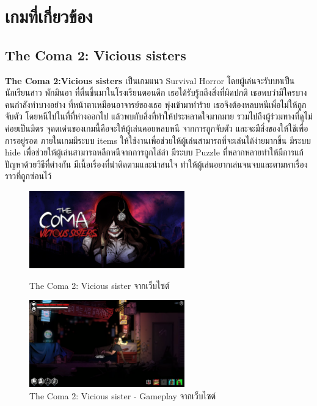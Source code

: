 \section{เกมที่เกี่ยวข้อง}
\subsection{The Coma 2: Vicious sisters}
\subsubitem \textbf{The Coma 2:Vicious sisters} \cite{the-coma-2:theory} 
เป็นเกมแนว Survival Horror โดยผู้เล่นจะรับบทเป็นนักเรียนสาว พักมินอา ที่ตื่นขึ้นมาในโรงเรียนตอนดึก 
เธอได้รับรู้ถถึงสิ่งที่ผิดปกติ เธอพบว่ามีใครบางคนกำลังทำบางอย่าง ที่หน้าตาเหมือนอาจารย์ของเธอ พุ่งเข้ามาทำร้าย 
เธอจึงต้องหลบหนีเพื่อไม่ให้ถูกจับตัว โดยหนีไปในที่ที่ห่างออกไป แล้วพบกับสิ่งที่ทำให้ประหลาดใจมากมาย 
รวมไปถึงผู้ร่วมทางที่ดูไม่ค่อยเป็นมิตร จุดดเด่นของเกมนี้คือจะให้ผู้เล่นคอยหลบหนี 
จากการถูกจับตัว และจะมีสิ่งของให้ใช้เพื่อการอยู่รอด ภายในเกมมีระบบ items ให้ใช้งานเพื่อช่วยให้ผู้เล่นสามารถที่จะเล่นได้ง่ายมากขึ้น 
มีระบบ hide เพื่อช่วยให้ผู้เล่นสามารถหลีกหนีจากการถูกไล่ล่า มีระบบ Puzzle ที่หลากหลายทำให้มีการแก้ปัญหาด้วยวิธีที่ต่างกัน 
มีเนื้อเรื่องที่น่าติดตามและน่าสนใจ ทำให้ผู้เล่นอยากเล่นจนจบและตามหาเรื่องราวที่ถูกซ่อนไว้
\begin{figure}[h]
  \centering
  \includegraphics[width=0.6\textwidth, height=0.2\textheight]{Images/H2x1_NSwitchDS_TheComa2ViciousSisters.jpg}
  \caption{The Coma 2: Vicious sister จากเว็บไซต์}\label{TheComa2ViciousSisters}
  \includegraphics[width=0.6\textwidth, height=0.2\textheight]{Images/the-coma-2-vicious-sisters-full-game-all-notes-no-commentary-1-6-28-screenshot_feature.png}
  \caption{The Coma 2: Vicious sister - Gameplay จากเว็บไซต์}\label{TheComa2ViciousSistersWalkThrough}
\end{figure}

